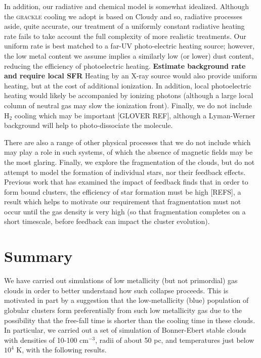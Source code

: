 \documentclass[useAMS,usenatbib]{mn2e}
\begin{document}
In addition, our radiative and chemical model is somewhat idealized.  Although the \textsc{grackle} cooling we adopt is based on Cloudy and so, radiative processes aside, quite accurate, our treatment of a uniformly constant radiative heating rate fails to take account the full complexity of more realistic treatments.  Our uniform rate is best matched to a far-UV photo-electric heating source; however, the low metal content we assume implies a similarly low (or lower) dust content, reducing the efficiency of photoelectric heating. {\bf Estimate background rate and require local SFR}  Heating by an X-ray source would also provide uniform heating, but at the cost of additional ionization.  In addition, local photoelectric heating would likely be accompanied by ionizing photons (although a large local column of neutral gas may slow the ionization front).  Finally, we do not include H$_2$ cooling which may be important [GLOVER REF], although a Lyman-Werner background will help to photo-dissociate the molecule.

There are also a range of other physical processes that we do not include which may play a role in such systems, of which the absence of magnetic fields may be the most glaring.  Finally, we explore the fragmentation of the clouds, but do not attempt to model the formation of individual stars, nor their feedback effects.  Previous work that has examined the impact of feedback finds that in order to form bound clusters, the efficiency of star formation must be high [REFS], a result which helps to motivate our requirement that fragmentation must not occur until the gas density is very high (so that fragmentation completes on a short timescale, before feedback can impact the cluster evolution).

% 
\section{Summary}

We have carried out simulations of low metallicity (but not primordial) gas clouds in order to better understand  how such collapse proceeds.  This is motivated in part by a suggestion that the low-metallicity (blue) population of globular clusters form preferentially from such low metallicity gas due to the possibility that the free-fall time is shorter than the cooling time in these clouds.  In particular, we carried out a set of simulation of Bonner-Ebert stable clouds with densities of 10-100 cm$^{-3}$, radii of about 50 pc, and temperatures just below $10^4$ K, with the following results.
\end{document}
